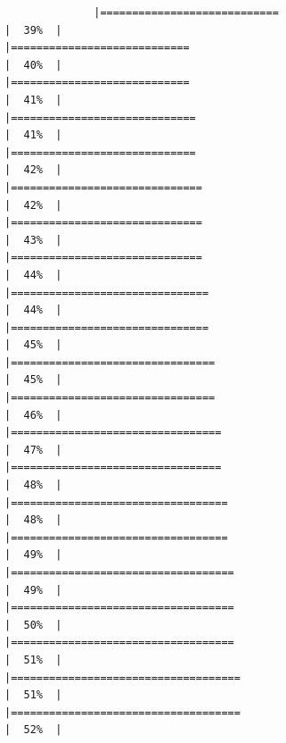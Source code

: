 \documentclass[
]{article}
\begin{document}
\begin{verbatim}
              |============================                                          |  39%  |                                                                              |============================                                          |  40%  |                                                                              |============================                                          |  41%  |                                                                              |=============================                                         |  41%  |                                                                              |=============================                                         |  42%  |                                                                              |==============================                                        |  42%  |                                                                              |==============================                                        |  43%  |                                                                              |==============================                                        |  44%  |                                                                              |===============================                                       |  44%  |                                                                              |===============================                                       |  45%  |                                                                              |================================                                      |  45%  |                                                                              |================================                                      |  46%  |                                                                              |=================================                                     |  47%  |                                                                              |=================================                                     |  48%  |                                                                              |==================================                                    |  48%  |                                                                              |==================================                                    |  49%  |                                                                              |===================================                                   |  49%  |                                                                              |===================================                                   |  50%  |                                                                              |===================================                                   |  51%  |                                                                              |====================================                                  |  51%  |                                                                              |====================================                                  |  52%  |                                                                 
\end{verbatim}
\end{document}

